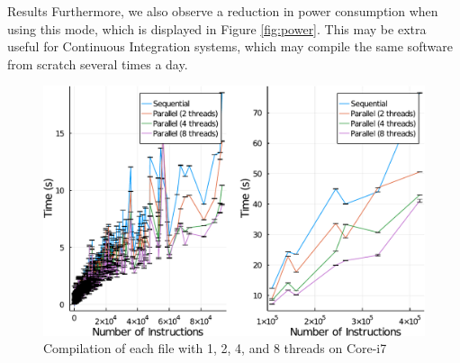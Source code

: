 \begin{subsection}{Results}
Furthermore, we also observe a reduction in power consumption when using this
mode, which is displayed in Figure \ref{fig:power}. This may be extra useful for Continuous Integration systems, which
may compile the same software from scratch several times a day.

\begin{table}[]
\caption{Speedup of highlighted files}
\label{table:files}
\end{table}

\begin{figure}
\centering
	 \includegraphics[scale=0.6]{figuras/times-insns-crop.pdf}
	  \caption{Compilation of each file with 1, 2, 4, and 8 threads on
	  Core-i7}
	  \label{fig:gcc_all_files}
\end{figure}


\end{subsection}

